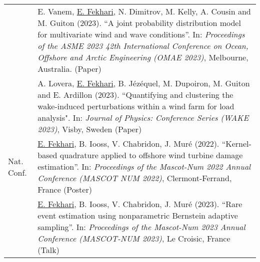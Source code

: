 \begin{table*}[h]
\begin{tabularx}{\textwidth}{l X}
                    & E. Vanem, \underline{E. Fekhari}, N. Dimitrov, M. Kelly, A. Cousin and M. Guiton (2023). 
                    ``A joint probability distribution model for multivariate wind and wave conditions''.
                    In: \textit{Proceedings of the ASME 2023 42th International Conference on Ocean, Offshore and Arctic Engineering (OMAE 2023)}, Melbourne, Australia. (Paper)\\
        
                    & A. Lovera, \underline{E. Fekhari}, B. Jézéquel, M. Dupoiron, M. Guiton and E. Ardillon (2023). 
                    ``Quantifying and clustering the wake-induced perturbations within a wind farm for load analysis". 
                    In: \textit{Journal of Physics: Conference Series (WAKE 2023)}, Visby, Sweden (Paper)\\
        
        Nat. Conf.  & \underline{E. Fekhari}, B. Iooss, V. Chabridon, J. Muré (2022).
                    ``Kernel-based quadrature applied to offshore wind turbine damage estimation''. 
                    In: \textit{Proceedings of the Mascot-Num 2022 Annual Conference (MASCOT NUM 2022)}, Clermont-Ferrand, France (Poster)\\
        
                    & \underline{E. Fekhari}, B. Iooss, V. Chabridon, J. Muré (2023).
                    ``Rare event estimation using nonparametric Bernstein adaptive sampling''. 
                    In: \textit{Proceedings of the Mascot-Num 2023 Annual Conference (MASCOT-NUM 2023)}, Le Croisic, France (Talk)\\
                    
        \end{tabularx}    
\end{table*}

